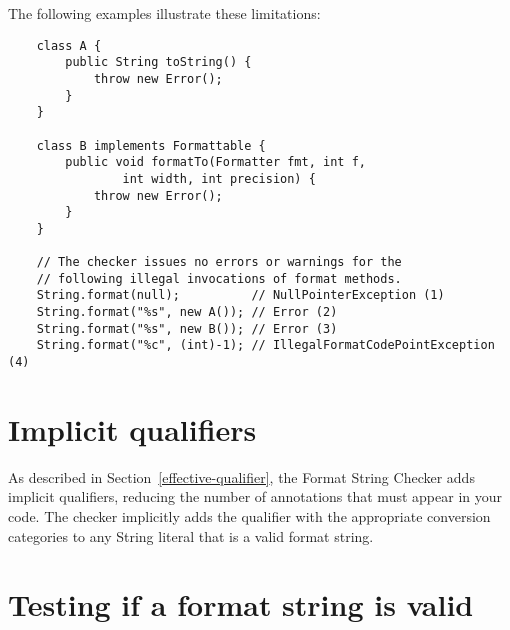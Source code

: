 \noindent The following examples illustrate these limitations:

\begin{Verbatim}
    class A {
        public String toString() {
            throw new Error();
        }
    }

    class B implements Formattable {
        public void formatTo(Formatter fmt, int f, 
                int width, int precision) {
            throw new Error();
        }
    }

    // The checker issues no errors or warnings for the
    // following illegal invocations of format methods.
    String.format(null);          // NullPointerException (1)
    String.format("%s", new A()); // Error (2)
    String.format("%s", new B()); // Error (3)
    String.format("%c", (int)-1); // IllegalFormatCodePointException (4)
\end{Verbatim}

% 
% 


\section{Implicit qualifiers}

As described in Section~\ref{effective-qualifier}, the Format String Checker adds implicit
qualifiers, reducing the number of annotations that must appear in your code.
The checker implicitly adds the  qualifier with the appropriate
conversion categories to any String literal that is a valid format string.

\section{Testing if a format string is valid}

